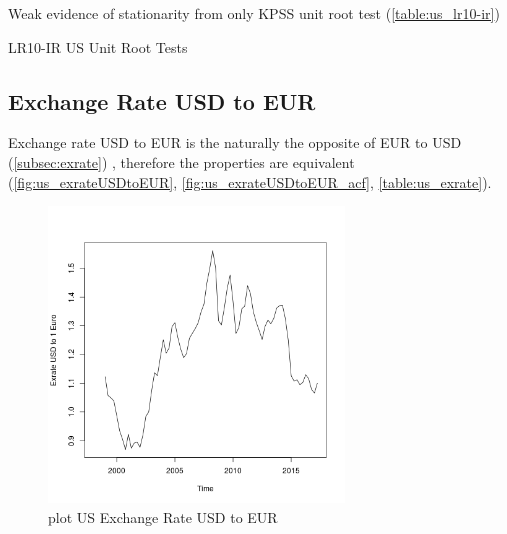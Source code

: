 \documentclass[10pt]{article}
\begin{document}
Weak evidence of stationarity from only KPSS unit root test (\autoref{table:us_lr10-ir})

\begin{table}[h!]
\centering
{}
\caption{LR10-IR US Unit Root Tests}
\label{table:us_lr10-ir}
\end{table}


\subsection{Exchange Rate USD to EUR}

Exchange rate USD to EUR is the naturally the opposite of EUR to USD (\autoref{subsec:exrate}) , therefore the properties are equivalent (\autoref{fig:us_exrateUSDtoEUR}, \autoref{fig:us_exrateUSDtoEUR_acf}, \autoref{table:us_exrate}).

\begin{figure}[h!]
\centering
\includegraphics[width = 0.7\textwidth]{"../plots/us_Exrate USD to 1 Euro"}
\caption{plot US Exchange Rate USD to EUR}
\label{fig:us_exrateUSDtoEUR}
\end{figure}
\end{document}
